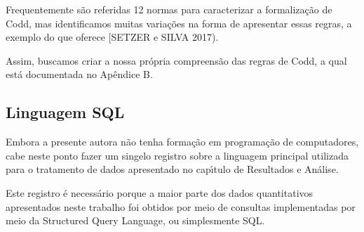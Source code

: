 \documentclass[
12pt,		%
openright,	%
twoside,  %
a4paper,			%
chapter=TITLE,		%
english,			%
french,				%
spanish,			%
brazil				%
]{USPSC-classe/USPSC}
\begin{document}
Frequentemente s\~ao referidas 12 normas para caracterizar a formaliza\c{c}\~ao de Codd, mas identificamos muitas varia\c{c}\~oes na forma de apresentar essas regras, a exemplo do que oferece [SETZER e SILVA 2017).

















Assim, buscamos criar a nossa pr\'opria compreens\~ao das regras de Codd, a qual est\'a documentada no Ap\^endice B.

















\subsection[Linguagem SQL]{Linguagem SQL}\label{Linguagem SQL}
Embora a presente autora n\~ao tenha forma\c{c}\~ao em programa\c{c}\~ao de computadores, cabe neste ponto fazer um singelo registro sobre a linguagem principal utilizada para o tratamento de dados apresentado no cap\'{\i}tulo de \textquotedbl Resultados e An\'alise\textquotedbl .

















Este registro \'e necess\'ario porque a maior parte dos dados quantitativos apresentados neste trabalho foi obtidos por meio de consultas implementadas por meio da Structured Query Language, ou simplesmente SQL.
\end{document}
